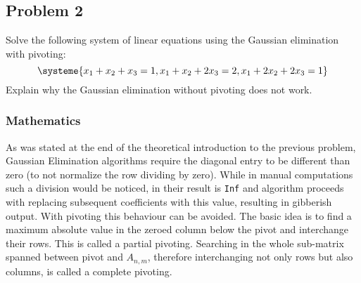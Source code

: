 \subsection{Problem 2}\label{problem:2}
Solve the following system of linear equations using the Gaussian elimination with pivoting:
\begin{equation*}
    \systeme{x_1+x_2+x_3=1,x_1+x_2+2x_3=2,x_1+2x_2+2x_3=1}
\end{equation*}
Explain why the Gaussian elimination without pivoting does not work.
\subsubsection*{Mathematics}
As was stated at the end of the theoretical introduction to the previous problem, Gaussian Elimination algorithms require the diagonal entry to be different than zero (to not normalize the row dividing by zero). While in manual computations such a division would be noticed, in \MATLAB their result is \texttt{Inf} and algorithm proceeds with replacing subsequent coefficients with this value, resulting in gibberish output. With pivoting this behaviour can be avoided. The basic idea is to find a maximum absolute value in the zeroed column below the pivot and interchange their rows. This is called a partial pivoting. Searching in the whole sub-matrix spanned between pivot and $A_{n,m}$, therefore interchanging not only rows but also columns, is called a complete pivoting.
